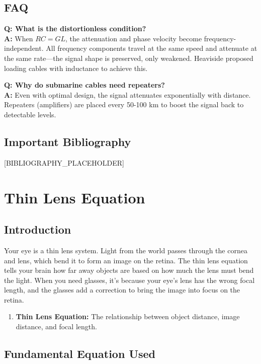 \documentclass[11pt,openright]{book}
\begin{document}
\section*{FAQ}

\textbf{Q: What is the distortionless condition?}\\
\textbf{A:} When $RC = GL$, the attenuation and phase velocity become frequency-independent. All frequency components travel at the same speed and attenuate at the same rate---the signal shape is preserved, only weakened. Heaviside proposed loading cables with inductance to achieve this.

\textbf{Q: Why do submarine cables need repeaters?}\\
\textbf{A:} Even with optimal design, the signal attenuates exponentially with distance. Repeaters (amplifiers) are placed every 50-100 km to boost the signal back to detectable levels.
\section*{Important Bibliography}

[BIBLIOGRAPHY_PLACEHOLDER]


\chapter{Thin Lens Equation}

\section*{Introduction}

Your eye is a thin lens system. Light from the world passes through the cornea and lens, which bend it to form an image on the retina. The thin lens equation tells your brain how far away objects are based on how much the lens must bend the light. When you need glasses, it's because your eye's lens has the wrong focal length, and the glasses add a correction to bring the image into focus on the retina.

\begin{enumerate}
\item \textbf{Thin Lens Equation:} The relationship between object distance, image distance, and focal length.

\end{enumerate}
\section*{Fundamental Equation Used}
\end{document}
